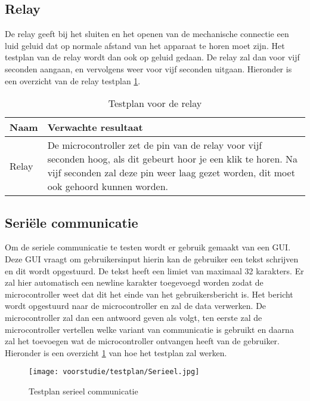 \subsection{Relay}
De relay geeft bij het sluiten en het openen van de mechanische connectie een luid geluid dat op normale afstand van het apparaat te horen moet zijn. Het testplan van de relay wordt dan ook op geluid gedaan. De relay zal dan voor vijf seconden aangaan, en vervolgens weer voor vijf seconden uitgaan. Hieronder is een overzicht van de relay testplan \ref{tab:hw_val_relay_testplan}.

\begin{table}[h!]
	\caption{Testplan voor de relay}
	\begin{tabular}{lp{14.5cm}}
	\toprule
	\textbf{Naam} 	& \textbf{Verwachte resultaat} \\ \toprule
	Relay			& De microcontroller zet de pin van de relay voor vijf seconden hoog, als dit gebeurt hoor je een klik te horen. Na vijf seconden zal deze pin weer laag gezet worden, dit moet ook gehoord kunnen worden.\\  \bottomrule
	\end{tabular}
	\label{tab:hw_val_relay_testplan}
\end{table}


\subsection{Seriële communicatie}
Om de seriele communicatie te testen wordt er gebruik gemaakt van een GUI. Deze GUI vraagt om gebruikersinput hierin kan de gebruiker een tekst schrijven en dit wordt opgestuurd. De tekst heeft een limiet van maximaal 32 karakters. Er zal hier automatisch een newline karakter toegevoegd worden zodat de microcontroller weet dat dit het einde van het gebruikersbericht is. Het bericht wordt opgestuurd naar de microcontroller en zal de data verwerken. De microcontroller zal dan een antwoord geven als volgt, ten eerste zal de microcontroller vertellen welke variant van communicatie is gebruikt en daarna zal het toevoegen wat de microcontroller ontvangen heeft van de gebruiker. Hieronder is een overzicht \ref{fig:testplanserieel} van hoe het testplan zal werken.

\begin{figure}[h!]
	\centering

	\label{fig:testplanserieel}
	\texttt{[image: voorstudie/testplan/Serieel.jpg]}
	\caption{Testplan serieel communicatie}
\end{figure}

